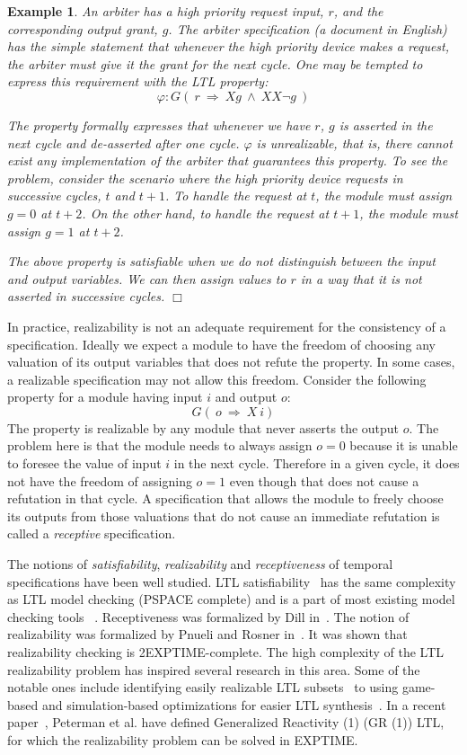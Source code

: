 \documentclass[a4paper, 11pt]{article}
\newtheorem{example}{Example} %
\begin{document}
\begin{example}
{\em
An arbiter has a high priority request input, $r$, and the corresponding
output grant, $g$. The arbiter specification (a document in English) has the
simple statement that {\em whenever the high priority device makes a request,
the arbiter must give it the grant for the next cycle}. One may be tempted
to express this requirement with the LTL property:
\[ \varphi: G(\ r\ \Rightarrow\  Xg\ \land\ XX \neg g\ ) \]

\noindent
The property formally expresses that {\em whenever
we have $r$, $g$ is asserted in the next cycle and de-asserted after one
cycle}. $\varphi$ is {\em unrealizable}, that is, there cannot exist any
implementation of the arbiter that guarantees this property. To see the
problem, consider the scenario where the high priority device requests in
successive cycles, $t$ and $t+1$. To handle the request at $t$, the
module must assign $g=0$ at $t+2$. On the other hand, to handle the request
at $t+1$, the module must assign $g=1$ at $t+2$.

The above property is {\em satisfiable} when we do not distinguish between
the input and output variables. We can then assign values to $r$ in a way
that it is not asserted in successive cycles. $\Box$
}
\end{example}

\noindent
In practice, realizability is not an adequate requirement for the
consistency of a specification. Ideally we expect a module to have
the freedom of choosing any valuation of its output variables that does not
refute the property. In some cases, a realizable specification may not
allow this freedom. Consider the following property for a module
having input $i$ and output $o$:
\[ G(\  o\ \Rightarrow\  X\ i ) \]
The property is realizable by any module that never asserts the output $o$.
The problem here is that the module needs to always assign $o=0$ because it
is unable to foresee the value of input $i$ in the next cycle. Therefore in
a given cycle, it does not have the freedom of assigning $o=1$ even though
that does not cause a refutation in that cycle. A specification that allows
the module to freely choose its outputs from those valuations that do not
cause an immediate refutation is called a {\em receptive} specification.

The notions of {\em satisfiability}, {\em realizability} and
{\em receptiveness} of temporal specifications 
have been well studied.
LTL satisfiability~\cite{vardi} has the same complexity as LTL model 
checking (PSPACE complete) and is a part of most existing model checking tools
~\cite{magellan, vis}.  Receptiveness was formalized by Dill in~\cite{dill}. 
The notion of realizability was formalized by Pnueli and Rosner
in~\cite{rosner}. It was shown that realizability checking is 
2EXPTIME-complete. The high complexity of the LTL realizability problem 
has inspired several research in this area. Some of the notable ones 
include identifying easily realizable LTL subsets~\cite{alur-ltl} to using 
game-based and simulation-based 
optimizations for easier LTL synthesis~\cite{barbara}. In a recent 
paper~\cite{nir}, Peterman
et al. have defined Generalized
Reactivity (1) (GR (1)) LTL, for which the realizability problem can be
solved in EXPTIME.
\end{document}
